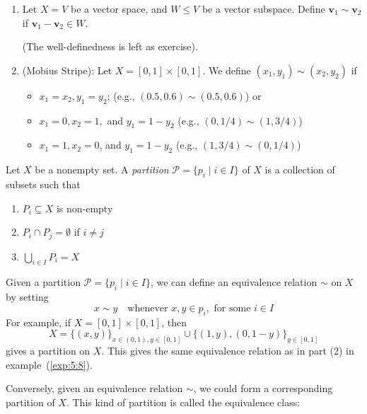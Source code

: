 \begin{example}\label{exp:5:8}
\begin{enumerate}
\item
Let $X=V$ be a vector space, and $W\le V$ be a vector subspace. 
Define $\bm v_1\sim \bm v_2$ if $\bm v_1-\bm v_2\in W$.

(The well-definedness is left as exercise).
\item
(Mobius Stripe):
Let $X=[0,1]\times[0,1]$.
We define $(x_1,y_1)\sim(x_2,y_2)$ if 
\begin{itemize}
\item
$x_1=x_2, y_1=y_2$; (e.g., $(0.5,0.6)\sim(0.5,0.6)$) or
\item
$x_1=0,x_2=1,$ and $y_1=1-y_2$ (e.g., $(0,1/4)\sim(1,3/4)$)
\item
$x_1=1,x_2=0$, and $y_1=1-y_2$ (e.g., $(1,3/4)\sim(0,1/4)$)
\end{itemize}
\end{enumerate}
\end{example}
\begin{definition}[Partition]
Let $X$ be a nonempty set. A \emph{partition} $\mathcal{P}=\{p_i\mid i\in I\}$ of $X$ is a collection of subsets such that
\begin{enumerate}
\item
$P_i\subseteq X$ is non-empty
\item
$P_i\cap P_j=\emptyset$ if $i\ne j$
\item
$\bigcup_{i\in I}P_i=X$
\end{enumerate}
\end{definition}
\begin{remark}
Given a partition $\mathcal{P}=\{p_i\mid i\in I\}$, we can define an equivalence relation $\sim$ on $X$ by setting
\[
x\sim y\quad
\text{whenever }x,y\in p_i,\text{ for some $i\in I$}
\]
For example, if $X=[0,1]\times[0,1]$, then 
\[
X=\{(x,y)\}_{x\in(0,1),y\in[0,1]}\cup\{(1,y),(0,1-y)\}_{y\in[0,1]}
\]
gives a partition on $X$. 
This gives the same equivalence relation as in part (2) in example~(\ref{exp:5:8}).
\end{remark}
Conversely, given an equivalence relation $\sim$, we could form a corresponding partition of $X$. This kind of partition is called the equivalence class:

